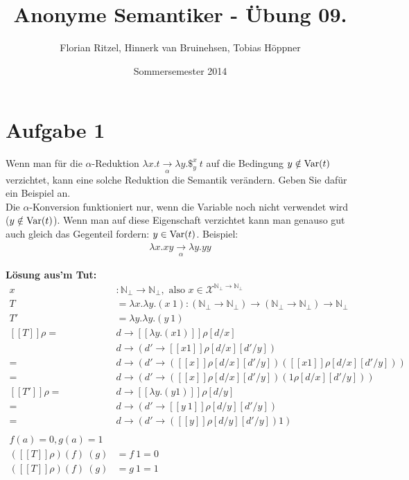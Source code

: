 \documentclass[ngerman,a4paper]{report}
\author{Florian Ritzel, Hinnerk van Bruinehsen, Tobias Höppner}
\title{Anonyme Semantiker - Übung 09. }
\date{Sommersemester 2014}
\renewcommand{\maketitle}{}
\begin{document}
\maketitle
\section*{Aufgabe 1}
Wenn man für die $\alpha$-Reduktion $\lambda x.t \xrightarrow[\alpha]{} \lambda y.\$_y^x\ t$ auf die Bedingung $y \notin \text{\lstinline!Var!}(t)$ verzichtet, kann eine solche Reduktion die Semantik verändern. Geben Sie dafür ein Beispiel an.\\

Die $\alpha$-Konversion funktioniert nur, wenn die Variable noch nicht verwendet wird ($y \notin \text{\lstinline!Var!}(t)$). Wenn man auf diese Eigenschaft verzichtet kann man genauso gut auch gleich das Gegenteil fordern: $y \in \text{\lstinline!Var!}(t)$. Beispiel:
\begin{align*}
\lambda x.xy \xrightarrow[\alpha]{}\lambda y.yy
\end{align*}

\textbf{Lösung aus'm Tut:}
\begin{align*}
x &: \mathbb{N}_\perp \rightarrow \mathbb{N}_\perp, \text{ also } x \in \mathcal{X}^{\mathbb{N}_\perp \rightarrow \mathbb{N}_\perp}\\
T &= \lambda x.\lambda y.(x\ 1) : (\mathbb{N}_\perp \rightarrow \mathbb{N}_\perp) \rightarrow (\mathbb{N}_\perp \rightarrow \mathbb{N}_\perp) \rightarrow \mathbb{N}_\perp\\
T' &= \lambda y . \lambda y . (y \ 1)\\
[\![ T ]\!] \rho = & d \rightarrow [\![ \lambda y . (x 1) ]\!] \rho [d/x]\\
&d \rightarrow (d' \rightarrow [\![ x 1 ]\!] \rho [d/x][d'/y])\\
=&d \rightarrow (d' \rightarrow ([\![ x ]\!] \rho [d/x][d'/y])( [\![ x 1 ]\!] \rho [d/x][d'/y]))\\
=&d \rightarrow (d' \rightarrow ([\![ x ]\!] \rho [d/x][d'/y])( 1 \rho [d/x][d'/y]))\\
[\![ T' ]\!] \rho = & d \rightarrow [\![ \lambda y . (y 1) ]\!] \rho [d/y]\\
= & d \rightarrow (d' \rightarrow [\![ y \ 1 ]\!] \rho [d/y][d'/y])\\
= & d \rightarrow (d' \rightarrow ([\![ y ]\!] \rho [d/y] [d'/y]) 1 )\\
\\
f(a) = 0, g(a) = 1\\
([\![ T ]\!] \rho) (f)\ (g) &=  f\ 1 = 0\\
([\![ T ]\!] \rho) (f)\ (g) &=  g\ 1 = 1\\
\end{align*}
\end{document}
